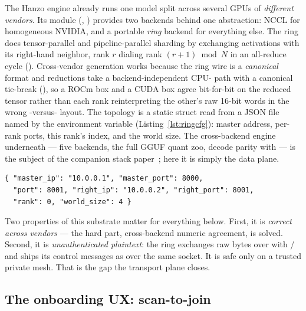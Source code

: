 \documentclass[11pt]{article}
\begin{document}
The Hanzo engine already runs one model split across several GPUs of \emph{different vendors}.
Its  module (,
) provides two backends behind one  abstraction:
NCCL for homogeneous NVIDIA, and a portable \emph{ring} backend for everything else. The ring
does tensor-parallel and pipeline-parallel sharding by exchanging activations with its
right-hand neighbor, rank $r$ dialing rank $(r{+}1) \bmod N$ in an all-reduce cycle
(). Cross-vendor generation works because the ring
wire is a \emph{canonical}  format and reductions take a backend-independent
CPU- path with a canonical tie-break (), so a ROCm box
and a CUDA box agree bit-for-bit on the reduced tensor rather than each rank reinterpreting the
other's raw 16-bit words in the wrong -versus- layout. The topology is a static struct read from a JSON file
named by the  environment variable (Listing~\ref{lst:ringcfg}): master
address, per-rank ports, this rank's index, and the world size. The cross-backend engine
underneath --- five backends, the full GGUF quant zoo, decode parity with  --- is
the subject of the companion stack paper~\cite{infstack}; here it is simply the data plane.

\begin{lstlisting}[caption={The data-plane topology today: a static \code{RING\_CONFIG} JSON.
Every node needs the full member list up front; nothing authenticates a peer.},label={lst:ringcfg}]
{ "master_ip": "10.0.0.1", "master_port": 8000,
  "port": 8001, "right_ip": "10.0.0.2", "right_port": 8001,
  "rank": 0, "world_size": 4 }
\end{lstlisting}

Two properties of this substrate matter for everything below. First, it is \emph{correct across
vendors} --- the hard part, cross-backend numeric agreement, is solved. Second, it is
\emph{unauthenticated plaintext}: the ring exchanges raw bytes over 
with / and ships its control messages as 
over the same socket. It is safe only on a trusted private mesh. That is the gap the transport
plane closes.

\subsection{The onboarding UX:  scan-to-join}
\label{sec:clustercli}
\end{document}
